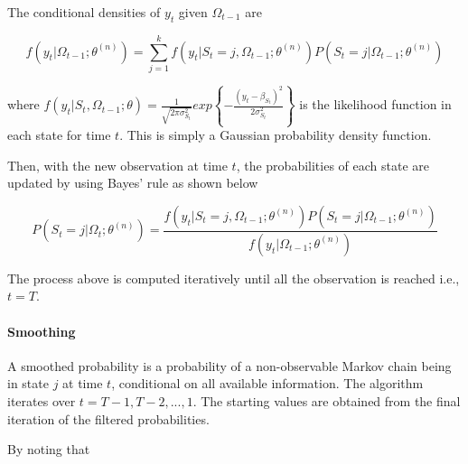 The conditional densities of $y_{t}$ given $\Omega_{t-1}$ are

\begin{equation}
f(y_{t}|\Omega_{t-1};\theta^{(n)})=\sum_{j=1}^{k}f(y_{t}|S_{t}=j,\Omega_{t-1};\theta^{(n)})P(S_{t}=j|\Omega_{t-1};\theta^{(n)})
\end{equation}

where $f(y_{t}|S_{t},\Omega_{t-1};\theta)=\frac{1}{\sqrt{2\pi\sigma_{S_{t}}^{2}}}exp\left\{ -\frac{(y_{t}-\beta_{S_{t}})^{2}}{2\sigma_{S_{t}}^{2}}\right\} $
is the likelihood function in each state for time $t$. This is simply
a Gaussian probability density function.

Then, with the new observation at time $t$, the probabilities of
each state are updated by using Bayes' rule as shown below

\begin{equation}
P(S_{t}=j|\Omega_{t};\theta^{(n)})=\frac{f(y_{t}|S_{t}=j,\Omega_{t-1};\theta^{(n)})P(S_{t}=j|\Omega_{t-1};\theta^{(n)})}{f(y_{t}|\Omega_{t-1};\theta^{(n)})}\label{eq:fProb}
\end{equation}

The process above is computed iteratively until all the observation
is reached i.e., $t=T$.

\paragraph{Smoothing}

A smoothed probability is a probability of a non-observable Markov
chain being in state $j$ at time $t$, conditional on all available
information. The algorithm iterates over $t=T-1,T-2,...,1$. The starting
values are obtained from the final iteration of the filtered probabilities.

By noting that

